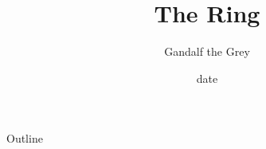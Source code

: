 \documentclass[table]{beamer}
\title{\centering The Ring}
\author{Gandalf the Grey}
\date{date}
\begin{document}
\begin{frame}
  \titlepage
\end{frame}
\begin{frame}{Outline}
  \tableofcontents
\end{frame}
\section{}

\begin{frame}{}
\end{frame}

\end{document}
